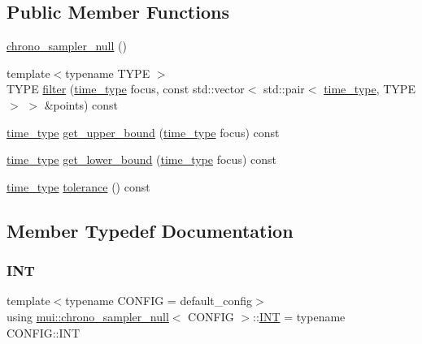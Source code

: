 \subsection*{Public Member Functions}
\begin{DoxyCompactItemize}
\item 
\hyperlink{classmui_1_1chrono__sampler__null_a2393f4179e3ae8326642e0ef6fbd3a34}{chrono\+\_\+sampler\+\_\+null} ()
\item 
{\footnotesize template$<$typename T\+Y\+PE $>$ }\\T\+Y\+PE \hyperlink{classmui_1_1chrono__sampler__null_a168a4636372969c4ac5b2d1134beacef}{filter} (\hyperlink{classmui_1_1chrono__sampler__null_a5a14f1c66478264e3fb50ba4fda7d78c}{time\+\_\+type} focus, const std\+::vector$<$ std\+::pair$<$ \hyperlink{classmui_1_1chrono__sampler__null_a5a14f1c66478264e3fb50ba4fda7d78c}{time\+\_\+type}, T\+Y\+PE $>$ $>$ \&points) const
\item 
\hyperlink{classmui_1_1chrono__sampler__null_a5a14f1c66478264e3fb50ba4fda7d78c}{time\+\_\+type} \hyperlink{classmui_1_1chrono__sampler__null_a2e62951320912bdde965c14f5bb437ef}{get\+\_\+upper\+\_\+bound} (\hyperlink{classmui_1_1chrono__sampler__null_a5a14f1c66478264e3fb50ba4fda7d78c}{time\+\_\+type} focus) const
\item 
\hyperlink{classmui_1_1chrono__sampler__null_a5a14f1c66478264e3fb50ba4fda7d78c}{time\+\_\+type} \hyperlink{classmui_1_1chrono__sampler__null_a75b62ec813645350a5edf91a06e1b7ef}{get\+\_\+lower\+\_\+bound} (\hyperlink{classmui_1_1chrono__sampler__null_a5a14f1c66478264e3fb50ba4fda7d78c}{time\+\_\+type} focus) const
\item 
\hyperlink{classmui_1_1chrono__sampler__null_a5a14f1c66478264e3fb50ba4fda7d78c}{time\+\_\+type} \hyperlink{classmui_1_1chrono__sampler__null_a3b498cf0cc749864c5e0798301bb9a2c}{tolerance} () const
\end{DoxyCompactItemize}


\subsection{Member Typedef Documentation}
\mbox{\label{classmui_1_1chrono__sampler__null_ac0e8f67e971e6aa38bccfab61ab19184}} 
\subsubsection{\texorpdfstring{I\+NT}{INT}}
{\footnotesize\ttfamily template$<$typename C\+O\+N\+F\+IG  = default\+\_\+config$>$ \\
using \hyperlink{classmui_1_1chrono__sampler__null}{mui\+::chrono\+\_\+sampler\+\_\+null}$<$ C\+O\+N\+F\+IG $>$\+::\hyperlink{classmui_1_1chrono__sampler__null_ac0e8f67e971e6aa38bccfab61ab19184}{I\+NT} =  typename C\+O\+N\+F\+I\+G\+::\+I\+NT}

